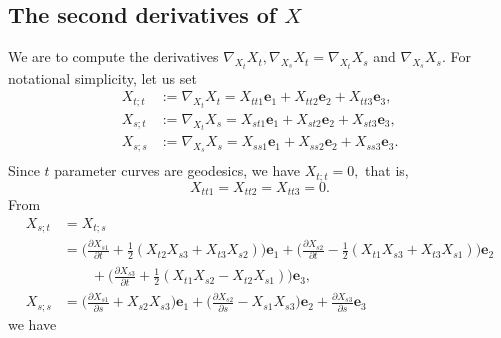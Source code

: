 \documentclass[11pt]{amsart}
\begin{document}
\subsection{The second derivatives of $X$}
We are to compute the derivatives $\nabla_{X_t} X_t, \nabla_{X_s}
X_t=\nabla_{X_t} X_s$ and $ \nabla_{X_s} X_s.$ For notational
simplicity, let us set
\[  \begin{split}
    X_{t;t} &:=\nabla_{X_t} X_t = X_{tt1} {\mathbf{e}}_1 + X_{tt2}{\mathbf{e}}_2 + X_{tt3} {\mathbf{e}}_3,   \\
    X_{s;t} &:=\nabla_{X_t} X_s = X_{st1} {\mathbf{e}}_1 + X_{st2}{\mathbf{e}}_2 + X_{st3} {\mathbf{e}}_3,   \\
    X_{s;s} &:=\nabla_{X_s} X_s = X_{ss1} {\mathbf{e}}_1 + X_{ss2}{\mathbf{e}}_2 + X_{ss3} {\mathbf{e}}_3 .  \\
\end{split}
\]
Since $t$ parameter curves are geodesics, we have $X_{t;t}=0,$
that is,
$$  X_{tt1} = X_{tt2} = X_{tt3} = 0 .$$
From
\[  \begin{split}
    X_{s;t}&= X_{t;s} \\
      &= \bigg( \frac{\partial X_{s1}}{\partial t}
              + \frac12(X_{t2}X_{s3}+X_{t3}X_{s2}) \bigg) {\mathbf{e}}_1
        + \bigg( \frac{\partial X_{s2}}{\partial t}
              - \frac12(X_{t1}X_{s3}+X_{t3}X_{s1}) \bigg){\mathbf{e}}_2  \\
      &\qquad + \bigg( \frac{\partial X_{s3}}{\partial t}
              +\frac12(X_{t1}X_{s2} - X_{t2}X_{s1}) \bigg){\mathbf{e}}_3,   \\
     X_{s;s}
      &= \bigg( \frac{\partial X_{s1}}{\partial s}
              + X_{s2}X_{s3} \bigg) {\mathbf{e}}_1
        + \bigg( \frac{\partial X_{s2}}{\partial s}
              - X_{s1}X_{s3} \bigg){\mathbf{e}}_2
        + \frac{\partial X_{s3}}{\partial s}  {\mathbf{e}}_3
\end{split}
\]
we have 
\end{document}

